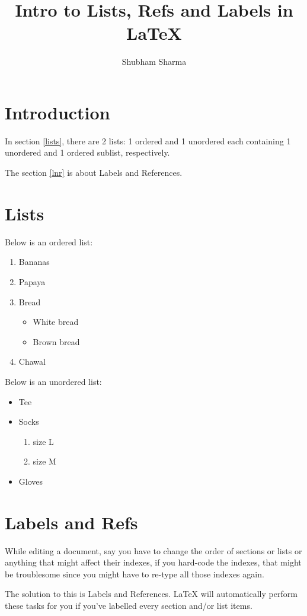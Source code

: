 \documentclass{article}
\author{Shubham Sharma}
\title{Intro to Lists, Refs and Labels in {\LaTeX}}
\begin{document}
\maketitle

\section{Introduction}
In section \ref{lists}, there are 2 lists: 1 ordered and 1 unordered each containing 1 unordered and 1 ordered sublist, respectively.

The section \ref{lnr} is about Labels and References.

\section{Lists\label{lists}}

Below is an ordered list:

\begin{enumerate}
    \item{Bananas}
    \item{Papaya}
    \item{Bread}
    \begin{itemize}
        \item{White bread}
        \item{Brown bread}
    \end{itemize}
    \item{Chawal}
\end{enumerate}

Below is an unordered list:

\begin{itemize}
    \item Tee
    \item Socks
    \begin{enumerate}
        \item size L
        \item size M
    \end{enumerate}
    \item Gloves
\end{itemize}

\section{Labels and Refs\label{lnr}}

While editing a document, say you have to change the order of sections or lists or anything that might affect their indexes, if you hard-code the indexes, that might be troublesome since you might have to re-type all those indexes again.

The solution to this is Labels and References. {\LaTeX} will automatically perform these tasks for you if you've labelled every section and/or list items.
\end{document}
